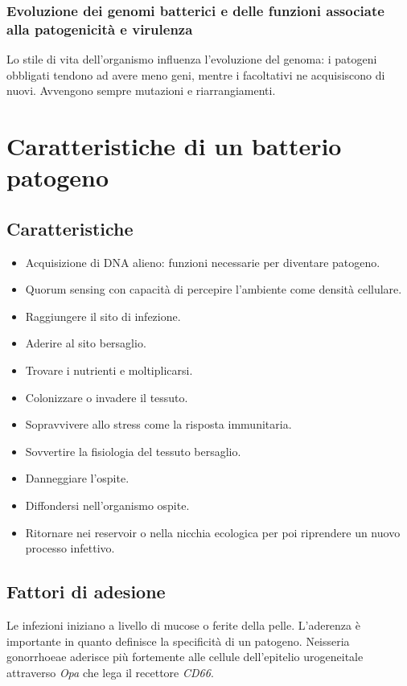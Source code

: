 		\subsubsection{Evoluzione dei genomi batterici e delle funzioni associate alla patogenicit\`a e virulenza}
		Lo stile di vita dell'organismo influenza l'evoluzione del genoma: i patogeni obbligati tendono ad avere meno geni, mentre i facoltativi ne acquisiscono di nuovi.
		Avvengono sempre mutazioni e riarrangiamenti.

\section{Caratteristiche di un batterio patogeno}

	\subsection{Caratteristiche}
	\begin{multicols}{2}
		\begin{itemize}
			\item Acquisizione di DNA alieno: funzioni necessarie per diventare patogeno.
			\item Quorum sensing con capacit\`a di percepire l'ambiente come densit\`a cellulare.
			\item Raggiungere il sito di infezione.
			\item Aderire al sito bersaglio.
			\item Trovare i nutrienti e moltiplicarsi.
			\item Colonizzare o invadere il tessuto.
			\item Sopravvivere allo stress come la risposta immunitaria.
			\item Sovvertire la fisiologia del tessuto bersaglio.
			\item Danneggiare l'ospite.
			\item Diffondersi nell'organismo ospite.
			\item Ritornare nei reservoir o nella nicchia ecologica per poi riprendere un nuovo processo infettivo.
		\end{itemize}
	\end{multicols}

	\subsection{Fattori di adesione}
	Le infezioni iniziano a livello di mucose o ferite della pelle.
	L'aderenza \`e importante in quanto definisce la specificit\`a di un patogeno.
	Neisseria gonorrhoeae aderisce pi\`u fortemente alle cellule dell'epitelio urogeneitale attraverso \emph{Opa} che lega il recettore \emph{CD66}.

